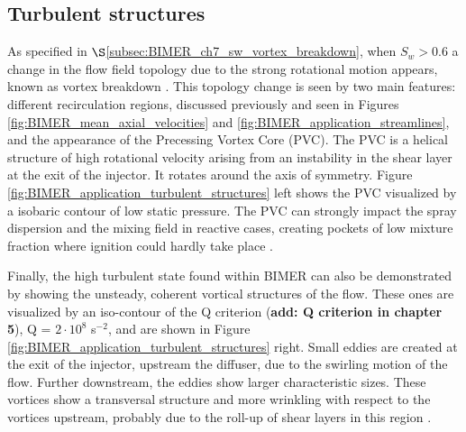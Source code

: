 \clearpage

\subsection{Turbulent structures}

As specified in $\S$\ref{subsec:BIMER_ch7_sw_vortex_breakdown}, when $S_w > 0.6$ a change in the flow field topology due to the strong rotational motion appears, known as vortex breakdown . This topology change is seen by two main features: different recirculation regions, discussed previously and seen in Figures \ref{fig:BIMER_mean_axial_velocities} and \ref{fig:BIMER_application_streamlines}, and the appearance of the Precessing Vortex Core (PVC). The PVC is a helical structure of high rotational velocity arising from an instability in the shear layer at the exit of the injector. It rotates around the axis of symmetry. Figure \ref{fig:BIMER_application_turbulent_structures} left shows the PVC visualized by a isobaric contour of low static pressure. The PVC can strongly impact the spray dispersion and the mixing field in reactive cases, creating pockets of low mixture fraction where ignition could hardly take place .

Finally, the high turbulent state found within BIMER can also be demonstrated by showing the unsteady, coherent vortical structures of the flow. These ones are visualized by an iso-contour of the Q criterion (\textbf{add: Q criterion in chapter 5}), Q = $2 \cdot 10^8$ s$^{-2}$, and are shown in Figure \ref{fig:BIMER_application_turbulent_structures} right. Small eddies are created at the exit of the injector, upstream the diffuser, due to the swirling motion of the flow. Further downstream, the eddies show larger characteristic sizes. These vortices show a transversal structure and more wrinkling with respect to the vortices upstream, probably due to the roll-up of shear layers in this region .


